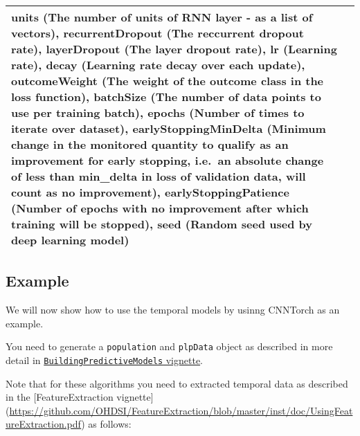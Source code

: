\documentclass[]{article}
\begin{document}
\begin{longtable}[]{@{}ll@{}}
\begin{minipage}[t]{0.82\columnwidth}
units (The number of units of RNN layer - as a list of vectors),
recurrentDropout (The reccurrent dropout rate), layerDropout (The layer
dropout rate), lr (Learning rate), decay (Learning rate decay over each
update), outcomeWeight (The weight of the outcome class in the loss
function), batchSize (The number of data points to use per training
batch), epochs (Number of times to iterate over dataset),
earlyStoppingMinDelta (Minimum change in the monitored quantity to
qualify as an improvement for early stopping, i.e.~an absolute change of
less than min\_delta in loss of validation data, will count as no
improvement), earlyStoppingPatience (Number of epochs with no
improvement after which training will be stopped), seed (Random seed
used by deep learning model)\strut
\end{minipage}\tabularnewline
\bottomrule
\end{longtable}

\subsection{Example}\label{example-1}

We will now show how to use the temporal models by usinng CNNTorch as an
example.

You need to generate a \texttt{population} and \texttt{plpData} object
as described in more detail in
\href{https://github.com/OHDSI/PatientLevelPrediction/blob/master/inst/doc/BuildingPredictiveModels.pdf}{\texttt{BuildingPredictiveModels}
vignette}.

Note that for these algorithms you need to extracted temporal data as
described in the {[}FeatureExtraction vignette{]}
(\url{https://github.com/OHDSI/FeatureExtraction/blob/master/inst/doc/UsingFeatureExtraction.pdf})
as follows:
\end{document}
